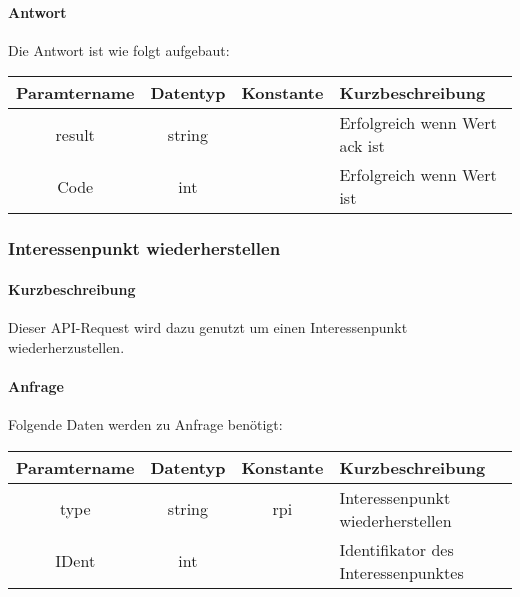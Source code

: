 \paragraph{Antwort}Die Antwort ist wie folgt aufgebaut:
\begin{table}[H]
	\begin{tabular}{|c|c|c|p{6.5cm}|}
		\hline
		\textbf{Paramtername} & \textbf{Datentyp} & \textbf{Konstante} & \textbf{Kurzbeschreibung}                                                                                               \\ \hline
		result              & string           &                 & Erfolgreich wenn Wert {\glqq ack\grqq} ist \\ \hline
		Code                & int              &                 & Erfolgreich wenn Wert {\glqq 0\grqq} ist \\ \hline
	\end{tabular}
\end{table}
\subsubsection{Interessenpunkt wiederherstellen}
\paragraph{Kurzbeschreibung}Dieser API-Request wird dazu genutzt um einen Interessenpunkt wiederherzustellen.
\paragraph{Anfrage}Folgende Daten werden zu Anfrage benötigt:
\begin{table}[H]
	\begin{tabular}{|c|c|c|p{6.5cm}|}
		\hline
		\textbf{Paramtername} & \textbf{Datentyp} & \textbf{Konstante} & \textbf{Kurzbeschreibung}                                                                                               \\ \hline
		type                & string            & rpi                & Interessenpunkt wiederherstellen \\ \hline
		IDent               & int               &                    & Identifikator des Interessenpunktes \\ \hline
	\end{tabular}
\end{table}
